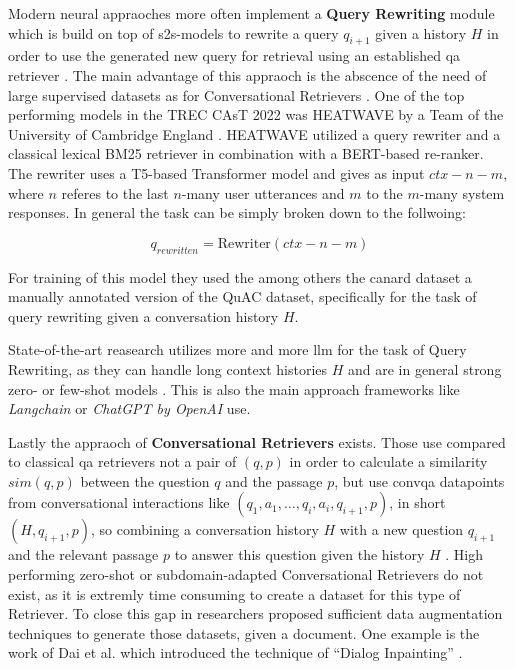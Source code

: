 Modern neural appraoches more often implement a \textbf{Query Rewriting} module which is build on top of \gls{s2s}-models to rewrite a query $q_{i+1}$ given a history $H$ in order to use the generated new query for retrieval using an established \gls{qa} retriever \cite{owoicho_trec_2022}. The main advantage of this appraoch is the abscence of the need of large supervised datasets as for Conversational Retrievers \cite{dai_dialog_2022}. One of the top performing models in the TREC CAsT 2022 was HEATWAVE by a Team of the University of Cambridge England \cite{liusie_university_nodate}. HEATWAVE utilized a query rewriter and a classical lexical BM25 retriever in combination with a BERT-based re-ranker. The rewriter uses a T5-based Transformer model and gives as input $ctx-n-m$, where $n$ referes to the last $n$-many user utterances and $m$ to the $m$-many system responses. In general the task can be simply broken down to the follwoing:

\begin{equation}
    q_{rewritten} = \text{Rewriter}(ctx-n-m)
\end{equation}

For training of this model they used the among others the canard dataset \cite{elgohary_can_2019} a manually annotated version of the QuAC dataset, specifically for the task of query rewriting given a conversation history $H$.

State-of-the-art reasearch utilizes more and more \gls{llm} for the task of Query Rewriting, as they can handle long context histories $H$ and are in general strong zero- or few-shot models \cite{mao_large_2023}. This is also the main approach frameworks like \textit{Langchain} \cite{noauthor_question_nodate} or \textit{ChatGPT by OpenAI} \cite{noauthor_chatgpt_2023} use. 


Lastly the appraoch of \textbf{Conversational Retrievers} exists. Those use compared to classical \gls{qa} retrievers not a pair of $(q,p)$ in order to calculate a similarity $sim(q,p)$ between the question $q$ and the passage $p$, but use \gls{convqa} datapoints from conversational interactions like $(q_1, a_1, \dots, q_i, a_i, q_{i+1}, p)$, in short $(H, q_{i+1}, p)$, so combining a conversation history $H$ with a new question $q_{i+1}$ and the relevant passage $p$ to answer this question given the history $H$ \cite{gao_neural_2022,dai_dialog_2022}. High performing zero-shot or subdomain-adapted Conversational Retrievers do not exist, as it is extremly time consuming to create a dataset for this type of Retriever. To close this gap in researchers proposed sufficient data augmentation techniques to generate those datasets, given a document. One example is the work of Dai et al. \cite{dai_dialog_2022} which introduced the technique of \enquote{Dialog Inpainting} \cite{dai_dialog_2022}.  

